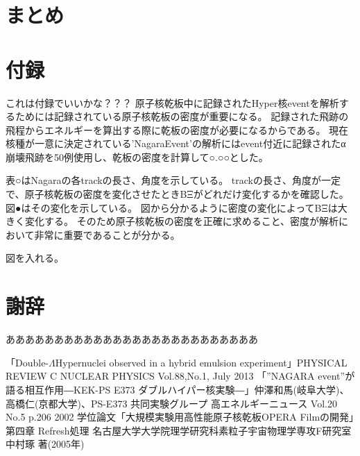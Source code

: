 \documentclass[12pt,a4paper]{jarticle}
\begin{document}
\newpage
\section{まとめ}

\section*{付録}
これは付録でいいかな？？？
原子核乾板中に記録されたHyper核eventを解析するためには記録されている原子核乾板の密度が重要になる。
記録された飛跡の飛程からエネルギーを算出する際に乾板の密度が必要になるからである。
現在核種が一意に決定されている'NagaraEvent'の解析にはevent付近に記録されたα崩壊飛跡を50例使用し、乾板の密度を計算して○.○○とした。
\par
表○はNagaraの各trackの長さ、角度を示している。
trackの長さ、角度が一定で、原子核乾板の密度を変化させたときBΞがどれだけ変化するかを確認した。
図●はその変化を示している。
図から分かるように密度の変化によってBΞは大きく変化する。
そのため原子核乾板の密度を正確に求めること、密度が解析において非常に重要であることが分かる。
\par
図を入れる。
\par


\section*{謝辞}
ああああああああああああああああああああああああああ
\begin{thebibliography}{99}
 「Double-$\Lambda$Hypernuclei observed in a hybrid emulsion experiment」PHYSICAL REVIEW C NUCLEAR PHYSICS Vol.88,No.1, July 2013
 「”NAGARA event”が語る相互作用―KEK-PS E373 ダブルハイパー核実験―」仲澤和馬(岐阜大学)、高橋仁(京都大学)、PS-E373 共同実験グループ 高エネルギーニュース Vol.20 No.5 p.206 2002
 学位論文「大規模実験用高性能原子核乾板OPERA Filmの開発」第四章 Refresh処理 名古屋大学大学院理学研究科素粒子宇宙物理学専攻F研究室 中村琢 著(2005年)
\end{thebibliography}
\end{document}
